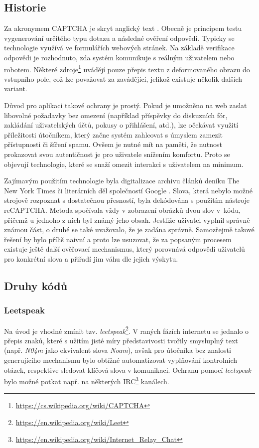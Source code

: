 \documentclass[
  field=ainfp,
  master=true,
  biblatex,
  sourcecodes=false,
  theorems=false,
  glossaries,
  index
]{kidiplom}
\begin{document}
\subsection{Historie}
Za akronymem CAPTCHA je skryt anglický text . Obecně je principem testu vygenerování určitého typu dotazu a následné ověření odpovědi. Typicky se technologie využívá ve formulářích webových stránek. Na základě verifikace odpovědi je rozhodnuto, zda systém komunikuje s reálným uživatelem nebo robotem. Některé zdroje\footnote{\url{https://cs.wikipedia.org/wiki/CAPTCHA}} uvádějí pouze přepis textu z deformovaného obrazu do vstupního pole, což lze považovat za zavádějící, jelikož existuje několik dalších  variant. 

Důvod pro aplikaci takové ochrany je prostý. Pokud je umožněno na web zaslat libovolné požadavky bez omezení (například příspěvky do diskuzních fór, zakládání uživatelských účtů, pokusy o přihlášení, atd.), lze očekávat využití příležitosti útočníkem, který začne systém zahlcovat s úmyslem zamezit přístupnosti či šíření spamu. Ovšem je nutné mít na paměti, že nutnost prokazovat svou autentičnost je pro uživatele snížením komfortu. Proto se objevují technologie, které se snaží omezit interakci s uživatelem na minimum. 

Zajímavým použitím technologie byla digitalizace archivu článků deníku The New York Times či literárních děl společností Google \cite{web:techcrunch}. Slova, která nebylo možné strojově rozpoznat s dostatečnou přesností, byla dekódována s použitím nástroje reCAPTCHA. Metoda spočívala vždy v zobrazení obrázků dvou slov v~kódu, přičemž u jednoho z nich byl známý jeho obsah. Jestliže uživatel vyplnil správně známou část, o druhé  se také uvažovalo, že je zadána správně. Samozřej\-mě takové řešení by bylo příliš naivní a proto lze usuzovat, že za popsaným procesem existuje ještě další ověřovací mechanismus, který porovnává odpovědi uživatelů pro konkrétní slova a přiřadí jim váhu dle jejich výskytu. 
\subsection{Druhy kódů}
 
\subsubsection*{Leetspeak} 
Na úvod je vhodné zmínit tzv. \textit{leetspeak}\footnote{\url{https://en.wikipedia.org/wiki/Leet}}. V raných fázích internetu se jednalo o přepis znaků, které s užitím jisté míry představivosti tvořily smysluplný text (např. \textit{N04m} jako ekvivalent slova \textit{Noam}), avšak pro útočníka bez znalosti generujícího mechanismu bylo obtížné automatizovat vyplňování kontrolních otázek, respektive sledovat klíčová slova v komunikaci. Ochranu pomocí \textit{leetspeak} bylo možné potkat např. na některých IRC\footnote{\url{https://en.wikipedia.org/wiki/Internet\_Relay\_Chat}} kanálech.
 
\end{document}
